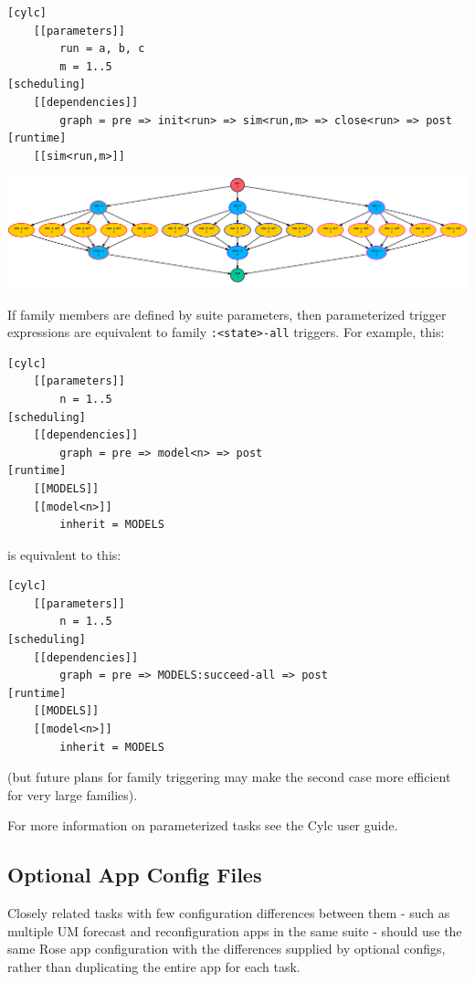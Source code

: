 \lstset{language=suiterc}
\begin{lstlisting}
[cylc]
    [[parameters]]
        run = a, b, c
        m = 1..5
[scheduling]
    [[dependencies]]
        graph = pre => init<run> => sim<run,m> => close<run> => post
[runtime]
    [[sim<run,m>]]
\end{lstlisting}

\includegraphics[width=\textwidth]{resources/png/param-2.png}

If family members are defined by suite parameters, then parameterized
trigger expressions are equivalent to family \lstinline=:<state>-all= triggers.
For example, this:

\lstset{language=suiterc}
\begin{lstlisting}
[cylc]
    [[parameters]]
        n = 1..5
[scheduling]
    [[dependencies]]
        graph = pre => model<n> => post
[runtime]
    [[MODELS]]
    [[model<n>]]
        inherit = MODELS
\end{lstlisting}

is equivalent to this:

\lstset{language=suiterc}
\begin{lstlisting}
[cylc]
    [[parameters]]
        n = 1..5
[scheduling]
    [[dependencies]]
        graph = pre => MODELS:succeed-all => post
[runtime]
    [[MODELS]]
    [[model<n>]]
        inherit = MODELS
\end{lstlisting}

(but future plans for family triggering may make the second case more
efficient for very large families).

For more information on parameterized tasks see the Cylc user guide.

\subsection{Optional App Config Files}
\label{Optional App Config Files}

Closely related tasks with few configuration differences between them - such as
multiple UM forecast and reconfiguration apps in the same suite - should use
the same Rose app configuration with the differences supplied by optional
configs, rather than duplicating the entire app for each task.

